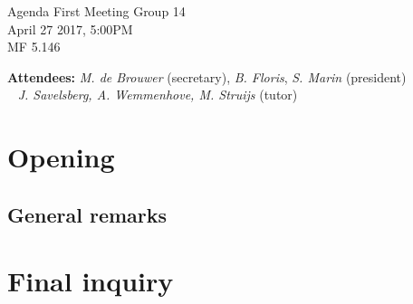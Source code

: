 \documentclass[a4paper,twoside,11pt]{article}
\title{}
\date{}
\begin{document}

\begin{center}
\Huge{Agenda First Meeting Group 14}
\\\vspace*{2mm}
\Large{April 27 2017, 5:00PM}
\\\vspace*{2mm}
\large{MF 5.146}
\\
		\end{center}

		\textbf{Attendees:} \textit{M. de Brouwer} (secretary), \textit{B. Floris}, \textit{S. Marin} (president)
\\\indent\qquad\,\,\,\,\,\qquad\quad \textit{J. Savelsberg, A. Wemmenhove, M. Struijs} (tutor)

	\section{Opening}
	\subsection*{\hspace{1.9em}General remarks}


	\section{Final inquiry}

	
\end{document}
